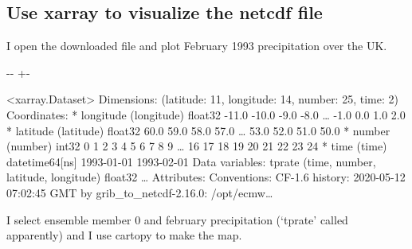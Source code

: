 \documentclass[letterpaper,10pt,english]{sphinxmanual}
\newlength\nbsphinxcodecellspacing
\begin{document}
\subsection{Use xarray to visualize the netcdf file}
\label{\detokenize{Notebooks/1.Download/1.Retrieve:Use-xarray-to-visualize-the-netcdf-file}}
I open the downloaded file and plot February 1993 precipitation over the UK.

{
\begin{sphinxVerbatim}[commandchars=\\\{\}]
\llap{\color{nbsphinxin}[5]:\,\hspace{\fboxrule}\hspace{\fboxsep}}

\end{sphinxVerbatim}
}

{

\kern-\sphinxverbatimsmallskipamount\kern-\baselineskip
\kern+\FrameHeightAdjust\kern-\fboxrule
\vspace{\nbsphinxcodecellspacing}

\begin{sphinxVerbatim}[commandchars=\\\{\}]
\llap{\color{nbsphinxout}[5]:\,\hspace{\fboxrule}\hspace{\fboxsep}}<xarray.Dataset>
Dimensions:    (latitude: 11, longitude: 14, number: 25, time: 2)
Coordinates:
  * longitude  (longitude) float32 -11.0 -10.0 -9.0 -8.0 {\ldots} -1.0 0.0 1.0 2.0
  * latitude   (latitude) float32 60.0 59.0 58.0 57.0 {\ldots} 53.0 52.0 51.0 50.0
  * number     (number) int32 0 1 2 3 4 5 6 7 8 9 {\ldots} 16 17 18 19 20 21 22 23 24
  * time       (time) datetime64[ns] 1993-01-01 1993-02-01
Data variables:
    tprate     (time, number, latitude, longitude) float32 {\ldots}
Attributes:
    Conventions:  CF-1.6
    history:      2020-05-12 07:02:45 GMT by grib\_to\_netcdf-2.16.0: /opt/ecmw{\ldots}
\end{sphinxVerbatim}
}

I select ensemble member 0 and february precipitation (‘tprate’ called apparently) and I use cartopy to make the map.
\end{document}
